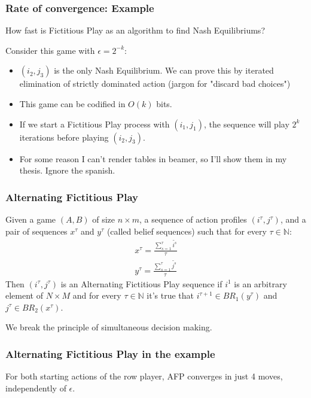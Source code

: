 \documentclass[pdf]{beamer}
\newcommand{\pstrat}{\widetilde}
\begin{document}
\begin{frame}
    \frametitle{Rate of convergence: Example}
    How fast is Fictitious Play as an algorithm to find Nash Equilibriums?

    \pause Consider this game with $\epsilon = 2^{-k}$:
    
    
    \begin{itemize}
        \item \pause $(i_2, j_3)$ is the only Nash Equilibrium. We can prove this by iterated elimination of strictly dominated action (jargon for "discard bad choices")
        \item \pause This game can be codified in $O(k)$ bits.
        \item \pause If we start a Fictitious Play process with $(i_1, j_1)$, the sequence will play $2^k$ iterations before playing $(i_2, j_3)$.
        \item \pause For some reason I can't render tables in beamer, so I'll show them in my thesis. Ignore the spanish.
    \end{itemize}
    
\end{frame}

\begin{frame}
    \frametitle{Alternating Fictitious Play}
    \begin{definition} \label{def:fp:berger}
        Given a game $(A, B)$  of size $n \times m$, a sequence of action profiles $(i^\tau, j^\tau)$, and a pair of sequences $x^\tau$ and $y^\tau$ (called belief sequences) such that for every $\tau \in \mathbb{N}$:
        \begin{gather*}
            x^\tau= \frac{\sum^\tau_{s=1} \pstrat{i^s}}{\tau}  \\
            y^\tau= \frac{\sum^\tau_{s=1} \pstrat{j^s}}{\tau}
        \end{gather*}
        Then $(i^\tau, j^\tau)$ is an Alternating Fictitious Play sequence if $i^1$ is an arbitrary element of $N \times M$ and for every $\tau \in \mathbb{N}$ it's true that $i^{\tau+1} \in BR_1(y^\tau)$ and $j^{\tau} \in BR_2(x^\tau)$.
    \end{definition}
    \pause We break the principle of simultaneous decision making.

\end{frame}

\begin{frame}
    \frametitle{Alternating Fictitious Play in the example}

    For both starting actions of the row player, AFP converges in just 4 moves, independently of $\epsilon$.
    

\end{frame}
\end{document}
